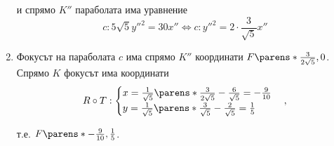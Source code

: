 \documentclass{../../common/topic}
\begin{document}
\begin{solution}
\begin{enumerate}
    и спрямо \( K'' \) параболата има уравнение
    \begin{equation*}
      c: 5 \sqrt 5 y''^2 = 30x''
      \iff
      c: y''^2 = 2 \cdot \frac 3 {\sqrt 5}x''
    \end{equation*}

    \item Фокусът на параболата \( c \) има спрямо \( K'' \) координати \( F \parens*{\frac 3 {2 \sqrt 5}, 0 } \). Спрямо \( K \) фокусът има координати
    \begin{equation*}
      R \circ T: \begin{cases}
        x = \frac 1 {\sqrt 5} \parens*{ \frac 3 {2 \sqrt 5} - \frac 6 {\sqrt 5} } = - \frac 9 {10} \\
        y = \frac 1 {\sqrt 5} \parens*{ \frac 3 {\sqrt 5} - \frac 2 {\sqrt 5} } = \frac 1 5
      \end{cases},
    \end{equation*}

    т.е. \( F \parens*{-\frac 9 {10}, \frac 1 5 } \).
  \end{enumerate}
\end{solution}

\printbibliography
\end{document}
